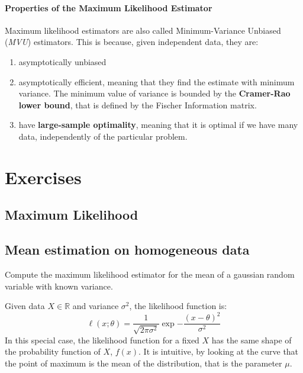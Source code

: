 \paragraph*{Properties of the Maximum Likelihood Estimator}
Maximum likelihood estimators are also called Minimum-Variance Unbiased (\textit{MVU}) estimators. This is because, given independent data, they are:
\begin{enumerate}
    \item asymptotically unbiased
    \item asymptotically efficient, meaning that they find the estimate with minimum variance. The minimum value of variance is bounded by the \textbf{Cramer-Rao lower bound}, that is defined by the Fischer Information matrix.
    \item have \textbf{large-sample optimality}, meaning that it is optimal if we have many data, independently of the particular problem.
\end{enumerate}


\section{Exercises}
\subsection{Maximum Likelihood}
\subsection{Mean estimation on homogeneous data}
\begin{exercise}
    Compute the maximum likelihood estimator for the mean of a gaussian random variable with known variance.
\end{exercise}
Given data $X \in \mathbb{R}$ and variance $\sigma^2$, the likelihood function is:
\[
    \ell(x;\theta) = \frac{1}{\sqrt{2\pi\sigma^2}} \exp{-\frac{(x-\theta)^2}{\sigma^2}}
\]
In this special case, the likelihood function for a fixed $X$ has the same shape of the probability function of $X$, $f(x)$.
It is intuitive, by looking at the curve that the point of maximum is the mean of the distribution, that is the parameter $\mu$.

